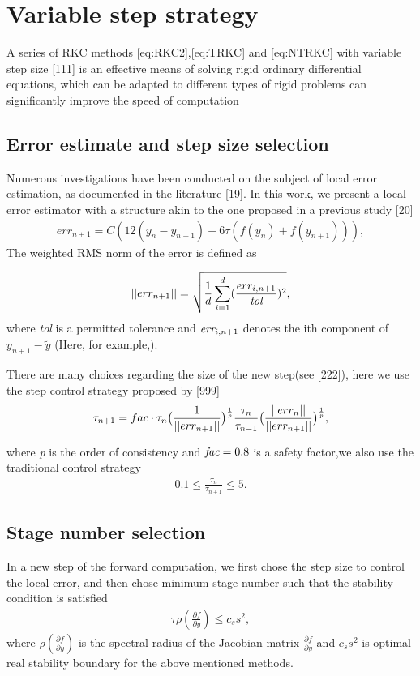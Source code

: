 \documentclass[review,fleqn]{elsarticle}
\begin{document}
\section{Variable step strategy }
A series of RKC methods \eqref{eq:RKC2},\eqref{eq:TRKC} and \eqref{eq:NTRKC} with variable step size [111] is an effective means of solving rigid ordinary differential equations, which can be adapted to different types of rigid problems can significantly improve the speed of computation
\subsection{Error estimate and step size selection}

Numerous investigations have been conducted on the subject of local error estimation, as documented in the literature [19]. 
In this work, we present a local error estimator with a structure akin to the one proposed in a previous study [20]
\begin{align}
    err_{n+1}=C(12(y_n-y_{n+1})+6\tau(f(y_n)+f(y_{n+1}))),
\end{align}
The weighted RMS norm of the error is defined as


\begin{align}
    ||err_{n+1}||=\sqrt{\frac{1}{d}\sum_{i=1}^d(\frac{err_{i,n+1}}{\emph{tol}})^2},
\end{align}
where \emph{tol} is a permitted tolerance and $\emph{err}_{i,n+1}$ denotes the ith component of $y_{n+1}-\tilde{y}$
(Here, for example,).

There are many choices regarding the size of the new step(see [222]), here we use the step control strategy proposed by [999]
\begin{align}
    \tau_{n+1}=fac\cdot\tau_n\big(\frac{1}{||err_{n+1}||}\big)^{\frac{1}{\emph{p}}}\frac{\tau_n}{\tau_{n-1}}\big(\frac{||err_n||}{||err_{n+1}||}\big)^{\frac{1}{\emph{p}}},
\end{align}


where \emph{p} is the order of consistency and $\emph{fac}=0.8$ is a safety factor,we also  use the traditional control strategy
\begin{align}
  0.1 \le \frac{\tau_n}{\tau_{n+1}} \le 5.
\end{align}
\subsection{Stage number selection}
In a new step of the forward computation, we first chose the step size to control the local error, and then chose minimum stage number such that the stability condition is satisfied
\begin{align}
    \tau\rho(\frac{\partial f}{\partial y}) \le c_ss^2,
    \label{eq:stage}
\end{align}
where $\rho(\frac{\partial f}{\partial y})$ is the spectral radius of the Jacobian matrix $\frac{\partial f}{\partial y}$ and $c_ss^2$ is optimal real stability boundary 
for the above mentioned methods.
\end{document}
